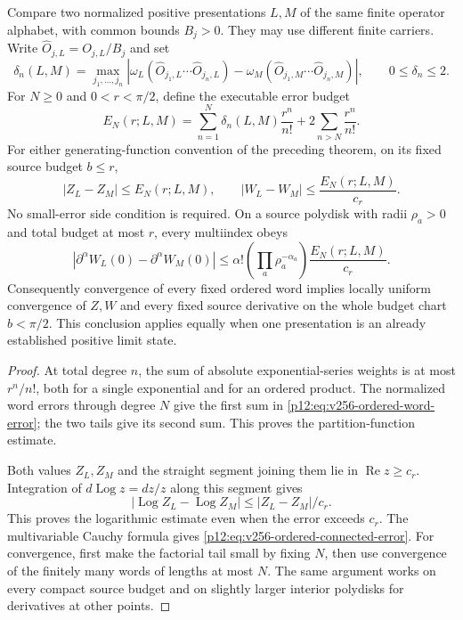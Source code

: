 \documentclass[12pt,a4paper]{article}
\begin{document}
\begin{corollary}
\label{p12:cor:v256-ordered-source-transfer}
Compare two normalized positive presentations $L,M$ of the same finite
operator alphabet, with common bounds $B_j>0$.  They may use different
finite carriers.  Write $\widehat O_{j,L}=O_{j,L}/B_j$ and set
\[
 \delta_n(L,M)=\max_{j_1,\ldots,j_n}
 \left|\omega_L(\widehat O_{j_1,L}\cdots\widehat O_{j_n,L})
       -\omega_M(\widehat O_{j_1,M}\cdots\widehat O_{j_n,M})\right|,
 \qquad 0\le\delta_n\le2.
\]
For $N\ge0$ and $0<r<\pi/2$, define the executable error budget
\begin{equation}
 E_N(r;L,M)=\sum_{n=1}^N\delta_n(L,M)\frac{r^n}{n!}
                +2\sum_{n>N}\frac{r^n}{n!}.
 \label{p12:eq:v256-ordered-word-error}
\end{equation}
For either generating-function convention of the preceding theorem,
on its fixed source budget $b\le r$,
\begin{equation}
 |Z_L-Z_M|\le E_N(r;L,M),\qquad
 |W_L-W_M|\le\frac{E_N(r;L,M)}{c_r}.
 \label{p12:eq:v256-ordered-log-error}
\end{equation}
No small-error side condition is required.  On a source polydisk with
radii $\rho_a>0$ and total budget at most $r$, every multiindex obeys
\begin{equation}
 |\partial^\alpha W_L(0)-\partial^\alpha W_M(0)|
 \le\alpha!\left(\prod_a\rho_a^{-\alpha_a}\right)
          \frac{E_N(r;L,M)}{c_r}.
 \label{p12:eq:v256-ordered-connected-error}
\end{equation}
Consequently convergence of every fixed ordered word implies locally
uniform convergence of $Z,W$ and every fixed source derivative on the
whole budget chart $b<\pi/2$.  This conclusion applies equally when
one presentation is an already established positive limit state.
\end{corollary}
\begin{proof}
At total degree $n$, the sum of absolute exponential-series weights is
at most $r^n/n!$, both for a single exponential and for an ordered
product.  The normalized word errors through degree $N$ give the first
sum in \eqref{p12:eq:v256-ordered-word-error}; the two tails give its
second sum.  This proves the partition-function estimate.

Both values $Z_L,Z_M$ and the straight segment joining them lie in
$\operatorname{Re}z\ge c_r$.  Integration of $d\operatorname{Log}z=dz/z$
along this segment gives
\[
 |\operatorname{Log}Z_L-\operatorname{Log}Z_M|
 \le |Z_L-Z_M|/c_r.
\]
This proves the logarithmic estimate even when the error exceeds
$c_r$.  The multivariable Cauchy formula gives
\eqref{p12:eq:v256-ordered-connected-error}.
For convergence, first make the factorial tail small by fixing $N$,
then use convergence of the finitely many words of lengths at most
$N$.  The same argument works on every compact source budget and on
slightly larger interior polydisks for derivatives at other points.
\end{proof}
\end{document}
